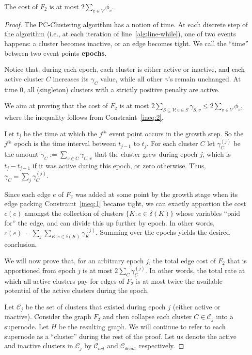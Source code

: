 \begin{lemma} \label{clustering_bound_bateni_3_3}
    The cost of \(F_2\) is at most \(2 \sum_{v \in V} \phi_v\).
\end{lemma}
\begin{proof}
The PC-Clustering algorithm has a notion of time. At each discrete step of the algorithm (i.e., at each iteration of line~\ref{alg:line-while}), one of two events happens: a cluster becomes inactive, or an edge becomes tight. We call the ``time'' between two event points \textbf{epochs}. 

Notice that, during each epoch, each cluster is either active or inactive, and each active cluster \(C\) increases its \(\gamma_C\) value, while all other \(\gamma\)'s remain unchanged. At time \(0\), all (singleton) clusters with a strictly positive penalty are active.

We aim at proving that the cost of \(F_2\) is at most \(2 \sum_{S \subseteq V : v \in S} \gamma_{S, v} \leq 2 \sum_{v \in V} \phi_v\), where the inequality follows from Constraint~\eqref{ineq:2}.

Let \(t_j\) be the time at which the \(j^{th}\) event point occurs in the growth step. So the \(j^{th}\) epoch is the time interval between \(t_{j-1}\) to \(t_j\). For each cluster \(C\) let \(\gamma_{C}^{(j)}\) be the amount \(\gamma_{C}:= \sum_{v \in C} \gamma_{C, v}\) that the cluster grew during epoch \(j\), which is  \(t_j - t_{j-1}\) if it was active during this epoch, or zero otherwise. Thus, \(\gamma_C = \sum_j \gamma_C^{(j)}\).

Since each edge \(e\) of \(F_2\) was added at some point by the growth stage when its edge packing Constraint~\eqref{ineq:1} became tight, we can exactly apportion the cost \(c (e)\) amongst the collection of clusters \(\{K: e \in \delta(K)\}\) whose variables ``paid for'' the edge, and can divide this up further by epoch. In other words, \(c (e) = \sum_j \sum_{K : e \in \delta (K)} \gamma_K^{(j)}\). Summing over the epochs yields the desired conclusion.

We will now prove that, for an arbitrary epoch \(j\), the total edge cost of \(F_2\) that is apportioned from epoch \(j\) is at most \(2 \sum_C \gamma_C^{(j)}\). In other words, the total rate at which all active clusters pay for edges of \(F_2\) is at most twice the available potential of the active clusters during the epoch.

Let \(\mathcal{C}_j\) be the set of clusters that existed during epoch \(j\) (either active or inactive). Consider the graph \(F_2\) and then collapse each cluster \(C \in \mathcal{C}_j\) into a supernode. Let \(H\) be the resulting graph. We will continue to refer to each supernode as a ``cluster'' during the rest of the proof. Let us denote the active and inactive clusters in \(\mathcal{C}_j\) by \(\mathcal{C}_{act}\) and \(\mathcal{C}_{dead}\), respectively.


\end{proof}
